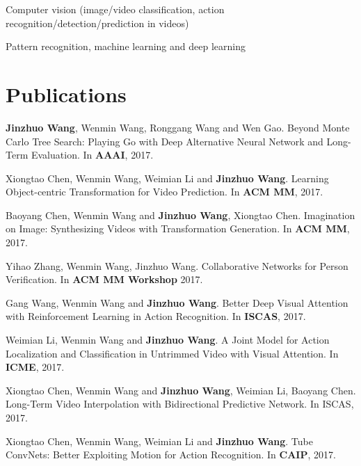 \documentclass[letterpaper]{article}
\renewenvironment{itemize}{
  \begin{list}{}{
    \setlength{\leftmargin}{1.5em}
  }
}{
  \end{list}
}
\begin{document}
\begin{itemize}
    \item Computer vision (image/video classification, action recognition/detection/prediction in videos)
    \item Pattern recognition, machine learning and deep learning
\end{itemize}

\section*{Publications}

\begin{itemize}

\item[1.] \textbf{Jinzhuo Wang}, Wenmin Wang, Ronggang Wang and Wen Gao. Beyond Monte Carlo Tree Search: Playing Go with Deep Alternative Neural Network and Long-Term Evaluation. In \textbf{AAAI}, 2017.

\item[2.] Xiongtao Chen, Wenmin Wang, Weimian Li and \textbf{Jinzhuo Wang}. Learning Object-centric Transformation for Video Prediction. In \textbf{ACM MM}, 2017.

\item[3.] Baoyang Chen, Wenmin Wang and \textbf{Jinzhuo Wang}, Xiongtao Chen. Imagination on Image: Synthesizing Videos with Transformation Generation. In \textbf{ACM MM}, 2017.

\item[4.] Yihao Zhang, Wenmin Wang, Jinzhuo Wang. Collaborative Networks for Person Verification. In \textbf{ACM MM Workshop} 2017.

\item[5.] Gang Wang, Wenmin Wang and \textbf{Jinzhuo Wang}. Better Deep Visual Attention with Reinforcement Learning in Action Recognition. In \textbf{ISCAS}, 2017.

\item[6.] Weimian Li, Wenmin Wang and \textbf{Jinzhuo Wang}. A Joint Model for Action Localization and Classification in Untrimmed Video with Visual Attention. In \textbf{ICME}, 2017.

\item[7.] Xiongtao Chen, Wenmin Wang and \textbf{Jinzhuo Wang}, Weimian Li, Baoyang Chen. Long-Term Video Interpolation with Bidirectional Predictive Network. In ISCAS, 2017.


\item[8.] Xiongtao Chen, Wenmin Wang, Weimian Li and \textbf{Jinzhuo Wang}. Tube ConvNets: Better Exploiting Motion for Action Recognition. In \textbf{CAIP}, 2017.


\end{itemize}
\end{document}
